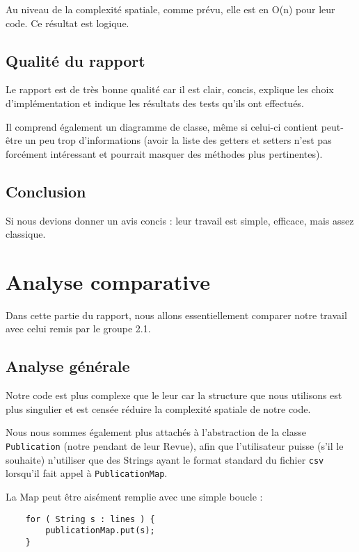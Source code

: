 \documentclass[a4paper,10pt]{article}
\begin{document}
	Au niveau de la complexité spatiale, comme prévu, elle est en O(n) pour leur code. Ce résultat est logique.

\subsection{Qualité du rapport}

	Le rapport est de très bonne qualité car il est clair, concis, explique les choix d'implémentation et indique les résultats des tests qu'ils ont effectués. 
	
	Il comprend également un diagramme de classe, même si celui-ci contient peut-être un peu trop d'informations (avoir la liste des getters et setters n'est pas forcément intéressant et pourrait masquer des méthodes plus pertinentes).

\subsection{Conclusion}

	Si nous devions donner un avis concis : leur travail est simple, efficace, mais assez classique.



\section{Analyse comparative}

	Dans cette partie du rapport, nous allons essentiellement comparer notre travail avec celui remis par le groupe 2.1.
	
\subsection{Analyse générale}

	Notre code est plus complexe que le leur car la structure que nous utilisons est plus singulier et est censée réduire la complexité spatiale de notre code.
	
	Nous nous sommes également plus attachés à l'abstraction de la classe \texttt{Publication} (notre pendant de leur Revue), afin que l'utilisateur puisse (s'il le souhaite) n'utiliser que des Strings ayant le format standard du fichier \texttt{csv} lorsqu'il fait appel à \texttt{PublicationMap}.

	La Map peut être aisément remplie avec une simple boucle :
	
	\vspace{0.4cm}
	\begin{lstlisting}
	for ( String s : lines ) {
		publicationMap.put(s);
	}
	\end{lstlisting}
	
\end{document}
